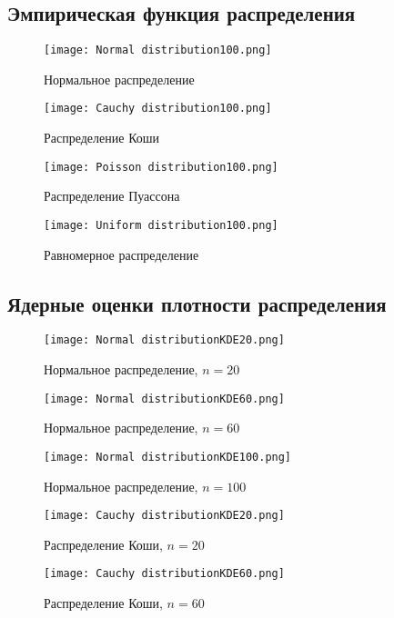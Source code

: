 \documentclass[a4paper]{article}
\begin{document}
\subsection{Эмпирическая функция распределения}
\begin{figure}[H]
	\centering
	{\texttt{[image: Normal distribution100.png]}}
		\caption{Нормальное распределение} 
		\label{fig:normal}
\end{figure}
\begin{figure}[H]
	{\texttt{[image: Cauchy distribution100.png]}}
		\caption{Распределение Коши} 
		\label{fig:normal}
	\end{figure}
\begin{figure}[H]
	{\texttt{[image: Poisson distribution100.png]}}
		\caption{Распределение Пуассона} 
		\label{fig:normal}
	\end{figure}
	
\begin{figure}[H]
	{\texttt{[image: Uniform distribution100.png]}}
		\caption{Равномерное распределение} 
		\label{fig:normal}
	\end{figure}
	
\subsection{Ядерные оценки плотности распределения}
\begin{figure}[H]
	{\texttt{[image: Normal distributionKDE20.png]}}
		\caption{Нормальное распределение, $n=20$} 
		\label{fig:normal}
	\end{figure}
	
\begin{figure}[H]
	{\texttt{[image: Normal distributionKDE60.png]}}
		\caption{Нормальное распределение, $n=60$} 
		\label{fig:normal}
	\end{figure}
		
\begin{figure}[H]
	{\texttt{[image: Normal distributionKDE100.png]}}
		\caption{Нормальное распределение, $n=100$} 
		\label{fig:normal}
	\end{figure}
\begin{figure}[H]
	{\texttt{[image: Cauchy distributionKDE20.png]}}
		\caption{Распределение Коши, $n=20$} 
		\label{fig:normal}
	\end{figure}
	
\begin{figure}[H]
	{\texttt{[image: Cauchy distributionKDE60.png]}}
		\caption{Распределение Коши, $n=60$} 
		\label{fig:normal}
	\end{figure}
	
\end{document}
